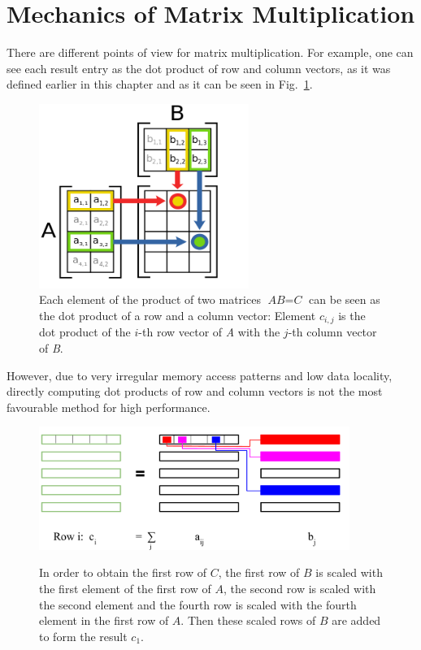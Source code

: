 \section{Mechanics of Matrix Multiplication}

There are different points of view for matrix multiplication. For example, one can see each result entry as the dot product of row and column vectors, as it was defined earlier in this chapter and as it can be seen in Fig.~\ref{fig:matmult_dot_product}.
\begin{figure}[tb]
\centering
 \includegraphics[height=6cm]{matrix_multiplication_wiki}
\caption{Each element of the product of two matrices $\textit{AB} = \textit{C}$ can be seen as the dot product of a row and a column vector: Element $c_{i,j}$ is the dot product of the $i$-th row vector of \textit{A} with the $j$-th column vector of \textit{B}.}
\label{fig:matmult_dot_product}
\end{figure}
However, due to very irregular memory access patterns and low data locality, directly computing dot products of row and column vectors is not the most favourable method for high performance. 



\begin{figure}[tb]
\centering
{\includegraphics[width=0.9\textwidth]{matrix_multiplication}}
\caption{In order to obtain the first row of $C$, the first row of $B$ is scaled with the first element of the first row of $A$, the second row is scaled with the second element and the fourth row is scaled with the fourth element in the first row of $A$. Then these scaled rows of $B$ are added to form the result $c_1$.}
\label{fig:matmult_petsc}
\end{figure}

